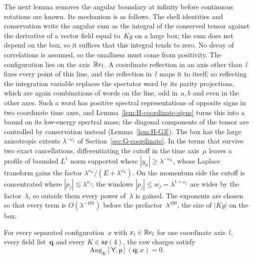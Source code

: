 The next lemma removes the angular boundary at infinity before continuous rotations are known. Its mechanism is as follows. The shell identities and conservation write the angular sum as the integral of the conserved tensor against the derivative of a vector field equal to~$Ky$ on a large box; the sum does not depend on the box, so it suffices that this integral tends to zero. No decay of correlations is assumed, so the smallness must come from positivity. The configuration lies on the axis~$\mathbb{R} e_l$. A coordinate reflection in an axis other than~$l$ fixes every point of this line, and the reflection in~$l$ maps it to itself; so reflecting the integration variable replaces the spectator word by its parity projections, which are again combinations of words on the line, odd in~$a,b$ and even in the other axes. Such a word has positive spectral representations of opposite signs in two coordinate time axes, and Lemma~\ref{lem:H-coordinate-signs} turns this into a bound on its low-energy spectral mass; the diagonal components of the tensor are controlled by conservation instead (Lemma~\ref{lem:H-G3}). The box has the large anisotropic extents $\lambda^{-\omega_j}$ of Section~\ref{sec:G-coordinate}. In the terms that survive two exact cancellations, differentiating the cutoff in the time axis~$\mu$ leaves a profile of bounded $L^1$ norm supported where $|y_\mu|\ge\lambda^{-\omega_\mu}$, whose Laplace transform gains the factor $\lambda^{\omega_\mu}/(E+\lambda^{\omega_\mu})$. On the momentum side the cutoff is concentrated where $|p_j|\lesssim\lambda^{\omega_j}$; the windows $|p_j|\le w_j=\lambda^{1+\omega_j}$ are wider by the factor~$\lambda$, so outside them every power of~$\lambda$ is gained. The exponents are chosen so that every term is $O(\lambda^{-101})$ before the prefactor~$\lambda^{100}$, the size of $|Ky|$ on the box.
\begin{lemma}\label{lem:G-collinear-flux}
For every separated configuration~$x$ with $x_i\in\mathbb{R} e_l$ for one coordinate axis~$l$, every field list~$\boldsymbol q$ and every $K\in\mathfrak{so}(4)$, the raw charges satisfy
\begin{equation}\label{eq:G-collinear}
\mathrm{Ang}_K[\mathsf Y,\mathsf p](\boldsymbol q;x)=0.
\end{equation}
\end{lemma}
